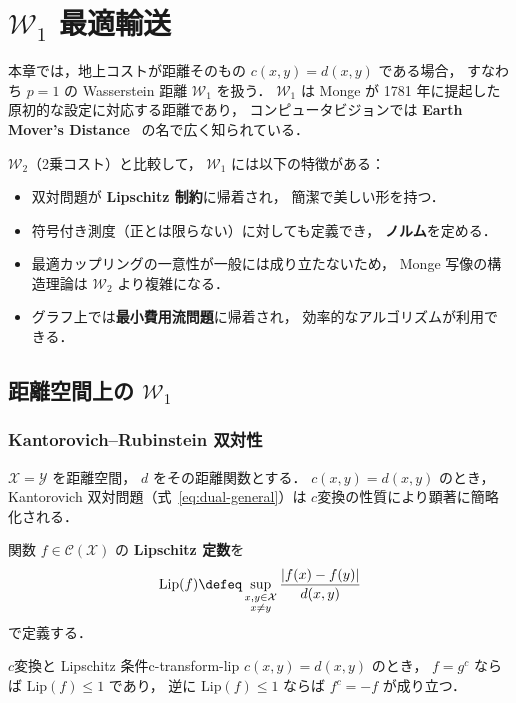 
\chapter{$\mathcal{W}_1$ 最適輸送}\label{chap:w1}

本章では，地上コストが距離そのもの $c(x,y) = d(x,y)$ である場合，
すなわち $p = 1$ の Wasserstein 距離 $\mathcal{W}_1$ を扱う．
$\mathcal{W}_1$ は Monge が 1781 年に提起した
原初的な設定に対応する距離であり，
コンピュータビジョンでは
\textbf{Earth Mover's Distance}~\cite{Rubner2000}
の名で広く知られている．

$\mathcal{W}_2$（2乗コスト）と比較して，
$\mathcal{W}_1$ には以下の特徴がある：
\begin{itemize}
  \item 双対問題が \textbf{Lipschitz 制約}に帰着され，
    簡潔で美しい形を持つ．
  \item 符号付き測度（正とは限らない）に対しても定義でき，
    \textbf{ノルム}を定める．
  \item 最適カップリングの一意性が一般には成り立たないため，
    Monge 写像の構造理論は $\mathcal{W}_2$ より複雑になる．
  \item グラフ上では\textbf{最小費用流問題}に帰着され，
    効率的なアルゴリズムが利用できる．
\end{itemize}


\section{距離空間上の $\mathcal{W}_1$}\label{sec:w1-metric}

\subsection{Kantorovich--Rubinstein 双対性}\label{subsec:kr-duality}

$\mathcal{X} = \mathcal{Y}$ を距離空間，
$d$ をその距離関数とする．
$c(x, y) = d(x, y)$ のとき，
Kantorovich 双対問題（式~\eqref{eq:dual-general}）は
$c$変換の性質により顕著に簡略化される．

関数 $f \in \mathcal{C}(\mathcal{X})$ の
\textbf{Lipschitz 定数}を
\[
  \mathrm{Lip}(f) \defeq
  \sup_{\substack{x, y \in \mathcal{X} \\ x \neq y}}
  \frac{|f(x) - f(y)|}{d(x, y)}
\]
で定義する．

\begin{proposition}{$c$変換と Lipschitz 条件}{c-transform-lip}
$c(x, y) = d(x, y)$ のとき，
$f = g^c$ ならば $\mathrm{Lip}(f) \leq 1$ であり，
逆に $\mathrm{Lip}(f) \leq 1$ ならば $f^c = -f$ が成り立つ．
\end{proposition}

